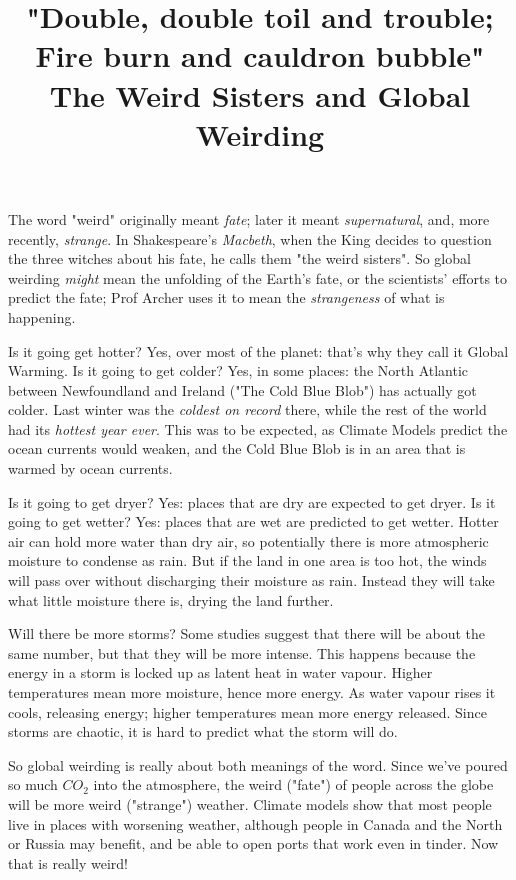 \documentclass[]{article}
\title{"Double, double toil and trouble; Fire burn and cauldron bubble"\\The Weird Sisters and Global Weirding}
\author{}
\begin{document}
\maketitle


 The word "weird" originally meant \textit{fate}; later it meant \textit{supernatural}, and, more recently, \textit{strange}. In Shakespeare's  \textit{Macbeth}, when the King decides to question the three witches about his fate, he calls them "the weird sisters". So global weirding \textit{might} mean the unfolding of the Earth's fate, or the scientists' efforts to predict the fate; Prof Archer uses it to mean the \textit{strangeness} of what is happening.

 Is it going get hotter? Yes, over most of the planet: that's why they call it Global Warming. Is it going to get colder? Yes, in some places: the North Atlantic between Newfoundland and Ireland ("The Cold Blue Blob") has actually got colder. Last winter was the \textit{coldest on record} there, while the rest of the world had its \textit{hottest year ever}. This was to be expected, as Climate Models predict the ocean currents would weaken, and the Cold Blue Blob is in an area that is warmed by ocean currents. 
 
 Is it going to get dryer? Yes: places that are dry are expected to get dryer. Is it going to get wetter? Yes: places that are wet are predicted to get wetter. Hotter air can hold more water than dry air, so potentially there is more atmospheric moisture to condense as rain. But if the land in one area is too hot, the winds will pass over without discharging their moisture as rain. Instead they will take what little moisture there is, drying the land further.

 Will there be more storms? Some studies suggest that there will be about the same number, but that they will be more intense. This happens because the energy in a storm is locked up as latent heat in water vapour. Higher temperatures mean more moisture, hence more energy. As water vapour rises it cools, releasing energy; higher temperatures mean more energy released. Since storms are chaotic, it is hard to predict what the storm will do.
 
 So global weirding is really about both meanings of the word. Since we've poured so much $CO_{2}$ into the atmosphere, the weird ("fate") of people across the globe will be more weird ("strange") weather. Climate models show that most people live in places with worsening weather, although people in Canada and the North or Russia may benefit, and be able to open ports that work even in tinder. Now that is really weird!
\end{document}
